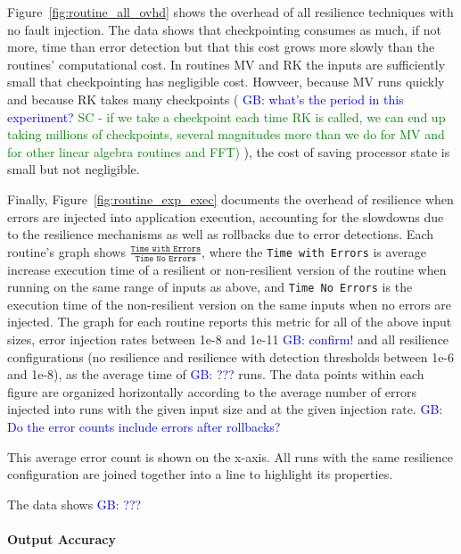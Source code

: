 \documentclass{sig-alternate}
\newcommand{\sui}[1]{%
  \textcolor{green}{SC - #1}
}
\newcommand{\greg}[1]{%
  \textcolor{blue}{GB: #1}
}
\begin{document}
Figure~\ref{fig:routine_all_ovhd} shows the overhead of all resilience techniques with no fault injection.
The data shows that checkpointing consumes as much, if not more, time than error detection but that this cost grows more slowly than the routines' computational cost.
In routines MV and RK the inputs are sufficiently small that checkpointing has negligible cost.
Howveer, because MV runs quickly and because RK takes many checkpoints (\greg{what's the period in this experiment?} \sui{if we take a checkpoint each time RK is called, we can end up taking millions of checkpoints, several magnitudes more than we do for MV and for other linear algebra routines and FFT)}), the cost of saving processor state is small but not negligible.

Finally, Figure~\ref{fig:routine_exp_exec} documents the overhead of resilience when errors are injected into application execution, accounting for the slowdowns due to the resilience mechanisms as well as rollbacks due to error detections.
Each routine's graph shows $\frac{\texttt{Time with Errors}}{\texttt{Time No Errors}}$, where the \texttt{Time with Errors} is average increase execution time of a resilient or non-resilient version of the routine when running on the same range of inputs as above, and \texttt{Time No Errors} is the execution time of the non-resilient version on the same inputs when no errors are injected.
The graph for each routine reports this metric for all of the above input sizes, error injection rates between 1e-8 and 1e-11 \greg{confirm!} and all resilience configurations (no resilience and resilience with detection thresholds between 1e-6 and 1e-8), as the average time of \greg{???} runs.
The data points within each figure are organized horizontally according to the average number of errors injected into runs with the given input size and at the given injection rate. \greg{Do the error counts include errors after rollbacks?}
This average error count is shown on the x-axis.
All runs with the same resilience configuration are joined together into a line to highlight its properties.

The data shows \greg{???}

\paragraph{Output Accuracy}
\end{document}
